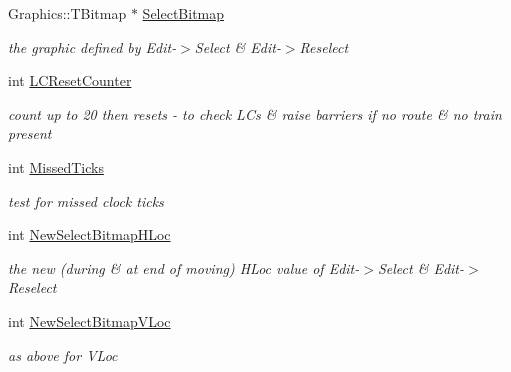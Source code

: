 \begin{DoxyCompactItemize}
\mbox{\label{class_t_interface_ab6a299c76cfb2b9c8e9e6966133b56a3}} 
Graphics\+::\+T\+Bitmap $\ast$ \mbox{\hyperlink{class_t_interface_ab6a299c76cfb2b9c8e9e6966133b56a3}{Select\+Bitmap}}
\begin{DoxyCompactList}\small\item\em the graphic defined by Edit-\/$>$Select \& Edit-\/$>$Reselect \end{DoxyCompactList}\item 
\mbox{\label{class_t_interface_a49670c19087423dc9ea68b5b6169a92b}} 
int \mbox{\hyperlink{class_t_interface_a49670c19087423dc9ea68b5b6169a92b}{L\+C\+Reset\+Counter}}
\begin{DoxyCompactList}\small\item\em count up to 20 then resets -\/ to check L\+Cs \& raise barriers if no route \& no train present \end{DoxyCompactList}\item 
\mbox{\label{class_t_interface_a54f8918641a888d1a288c8a5573b2850}} 
int \mbox{\hyperlink{class_t_interface_a54f8918641a888d1a288c8a5573b2850}{Missed\+Ticks}}
\begin{DoxyCompactList}\small\item\em test for missed clock ticks \end{DoxyCompactList}\item 
\mbox{\label{class_t_interface_acc7d4b190b0401de81b7173e85cc7fe7}} 
int \mbox{\hyperlink{class_t_interface_acc7d4b190b0401de81b7173e85cc7fe7}{New\+Select\+Bitmap\+H\+Loc}}
\begin{DoxyCompactList}\small\item\em the new (during \& at end of moving) H\+Loc value of Edit-\/$>$Select \& Edit-\/$>$Reselect \end{DoxyCompactList}\item 
\mbox{\label{class_t_interface_abd8470c9d77aaaed996ab1451d28c9c6}} 
int \mbox{\hyperlink{class_t_interface_abd8470c9d77aaaed996ab1451d28c9c6}{New\+Select\+Bitmap\+V\+Loc}}
\begin{DoxyCompactList}\small\item\em as above for V\+Loc \end{DoxyCompactList}\item 

\end{DoxyCompactItemize}
